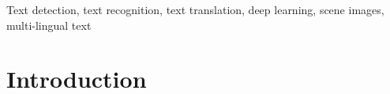 \documentclass{ieeeaccess}
\begin{document}
\begin{keywords}
Text detection, text recognition, text translation, deep learning,
scene images, multi-lingual text
\end{keywords}

\titlepgskip=-21pt

\maketitle

\section{Introduction}
\label{sec:introduction}
\end{document}
